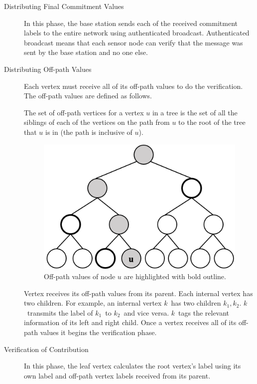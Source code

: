 	\begin{description}
		\item[Distributing Final Commitment Values]
			In this phase, the base station sends each of the received commitment labels to the entire network using authenticated broadcast.
			Authenticated broadcast means that each sensor node can verify that the message was sent by the base station and no one else.
		\item[Distributing Off-path Values]
			Each vertex must receive all of its off-path values to do the verification.
			The off-path values are defined as follows.
			\begin{definition}
				\label{def:off-path}
				\cite{chan2006secure}
				The set of off-path vertices for a vertex $u$ in a tree is the set of all the siblings of each of the vertices on the path from $u$ to the root of the tree that $u$ is in (the path is inclusive of $u$).
			\end{definition}
			\begin{figure}[h!]
				\centering
				\includegraphics[scale = 1]{images/off-path.png}
				\caption{Off-path values of node $u$ are highlighted with bold outline.}
				\label{fig:commitment-tree-example-2-shia}
			\end{figure}
			Vertex receives its off-path values from its parent.
			Each internal vertex has two children.
			For example, an internal vertex $k$\ has two children $k_{1},k_{2}$.
			$k$\ transmits the label of $k_{1}$\ to $k_{2}$\ and vice versa.
			$k$\ tags the relevant information of its left and right child.
			Once a vertex receives all of its off-path values it begins the verification phase.
		\item[Verification of Contribution]
			In this phase, the leaf vertex calculates the root vertex's label using its own label and off-path vertex labels received from its parent.

\end{description}
